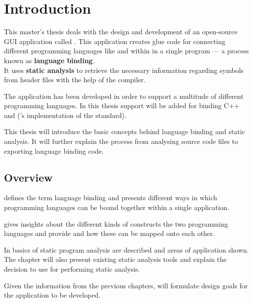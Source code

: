 \chapter{Introduction}

This master's thesis deals with the design and development of an open-source GUI application called . This application creates glue code for connecting different programming languages like  and  within in a single \linebreak program --- a process known as \textbf{language binding}.\\
It uses \textbf{static analysis} to retrieve the necessary information regarding symbols from  header files with the help of the   compiler.

The application has been developed in order to support a multitude of different \linebreak programming languages. In this thesis support will be added for binding C++ and  ('s implementation of the  standard).

This thesis will introduce the basic concepts behind language binding and static analysis. It will further explain the process from analysing source code files to exporting language binding code.

\section{Overview}

 defines the term language binding and presents different ways in which programming languages can be bound together within a single application.

 gives insights about the different kinds of constructs the two programming languages  and  provide and how these can be mapped onto each other.

In  basics of static program analysis are described and areas of application shown. The chapter will also present existing static analysis tools and explain the decision to use  for performing static analysis.

Given the information from the previous chapters,  will formulate design goals for the application to be developed.

